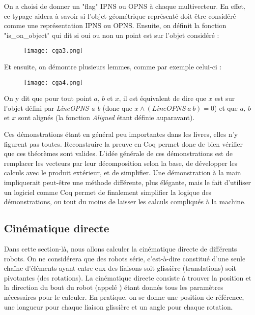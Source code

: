 On a choisi de donner un "flag" IPNS ou OPNS à chaque multivecteur. En effet, ce typage aidera à savoir si l'objet géométrique représenté doit être considéré comme une représentation IPNS ou OPNS. Ensuite, on définit la fonction "is\_on\_object" qui dit si oui ou non un point est sur l'objet considéré :  

\begin{figure}[!ht]
\centering
\texttt{[image: cga3.png]}
\end{figure}

Et ensuite, on démontre plusieurs lemmes, comme par exemple celui-ci : 
\begin{figure}[!ht]
\centering
\texttt{[image: cga4.png]}
\end{figure}

On y dit que pour tout point $a$, $b$ et $x$, il est équivalent de dire que $x$ est sur l'objet défini par \textit{LineOPNS a b} (donc que $x\wedge (LineOPNS\ a\ b) = 0$) et que $a$, $b$ et $x$ sont alignés (la fonction \textit{Aligned} étant définie auparavant).

Ces démonstrations étant en général peu importantes dans les livres, elles n'y figurent pas toutes. Reconstruire la preuve en Coq permet donc de bien vérifier que ces théorèmes sont valides. L'idée générale de ces démonstrations est de remplacer les vecteurs par leur décomposition selon la base, de développer les calculs avec le produit extérieur, et de simplifier. Une démonstration à la main impliquerait peut-être une méthode différente, plus élégante, mais le fait d'utiliser un logiciel comme Coq permet de finalement simplifier la logique des démonstrations, ou tout du moins de laisser les calculs compliqués à la machine. 

\subsection{Cinématique directe}

Dans cette section-là, nous allons calculer la cinématique directe de différents robots. On ne considérera que des robots série, c'est-à-dire constitué d'une seule chaîne d'éléments ayant entre eux des liaisons soit glissière (translations) soit pivotantes (des rotations). La cinématique directe consiste à trouver la position et la direction du bout du robot (appelé ) étant donnés tous les paramètres nécessaires pour le calculer. En pratique, on se donne une position de référence, une longueur pour chaque liaison glissière et un angle pour chaque rotation.

